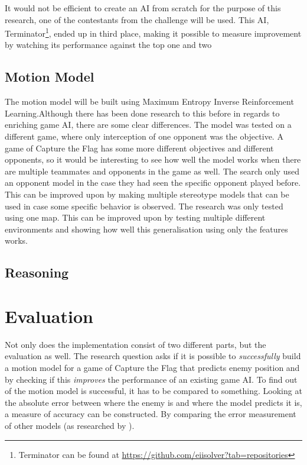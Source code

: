 \documentclass[a4paper, 12pt]{article}
\begin{document}
It would not be efficient to create an AI from scratch for the purpose of
this research, one of the contestants from the challenge will be
used. This AI, Terminator\footnote{Terminator can be found at \url{https://github.com/eiisolver?tab=repositories}}, ended up in third place, making it possible to
measure improvement by watching its performance against the top one and two

\subsection{Motion Model}
The motion model will be built using Maximum Entropy Inverse Reinforcement
Learning.Although there has been done research to this before \citep{6374144}
in regards to enriching game AI, there are some clear differences. 
The model was tested on a different game, where only interception of one
opponent was the objective. A game of Capture the Flag has some more different
objectives and different opponents, so it would be interesting to see how well
the model works when there are multiple teammates and opponents in the game as
well.
The search only used an opponent model in the case they had seen the specific
opponent played before. This can be improved upon by making multiple stereotype
models that can be used in case some specific behavior is observed. 
The research was only tested using one map. This can be improved upon by testing
multiple different environments and showing how well this generalisation using
only the features works.
\subsection{Reasoning}

\section{Evaluation}
Not only does the implementation consist of two different parts, but the evaluation as well. The
research question asks if it is possible to \emph{successfully} build a motion
model for a game of Capture the Flag that predicts enemy position and by
checking if this \emph{improves} the performance of an existing game AI. To
find out of the motion model is successful, it has to be compared to something.
Looking at the absolute error between where the enemy is and where the model
predicts it is, a measure of accuracy can be constructed. By comparing the error
measurement of other models (as researched by \citep{Hladky_anevaluation}
\citep{weber2011aiide} \citep{Laird:2001:KYG:375735.376343} \citep{6374144}).
\end{document}
